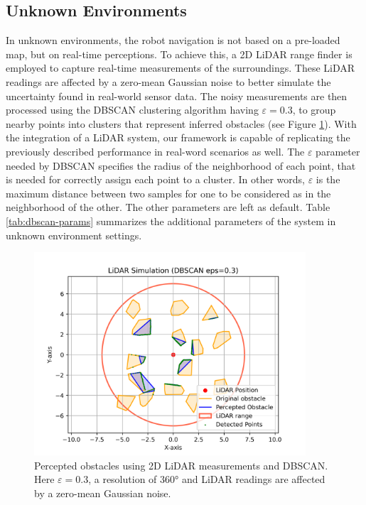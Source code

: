 \subsection{Unknown Environments}
In unknown environments, the robot navigation is not based on a pre-loaded map, but on real-time perceptions.
To achieve this, a 2D LiDAR range finder is employed to capture real-time measurements of the surroundings.
These LiDAR readings are affected by a zero-mean Gaussian noise to better simulate the uncertainty found in real-world sensor data.
The noisy measurements are then processed using the DBSCAN clustering algorithm having $\varepsilon = 0.3$, to
group nearby points into clusters that represent inferred obstacles (see Figure \ref{fig:dbscan_and_rangefinder}).
With the integration of a LiDAR system, our framework is capable of replicating the previously described performance
in real-word scenarios as well.
The $\varepsilon$ parameter needed by DBSCAN specifies the radius of the neighborhood of each point, that is
needed for correctly assign each point to a cluster. In other words,
$\varepsilon$ is the maximum distance between two samples for
one to be considered as in the neighborhood of the other.
The other parameters are left as default. Table \ref{tab:dbscan-params} summarizes the additional parameters of the
system in unknown environment settings.

\begin{figure}[H]
    \centering
    \includegraphics[width=0.9\textwidth]{../figures/Simulations/dbscan/dbscan_and_rangefinder.png}
    \caption{Percepted obstacles using 2D LiDAR measurements and DBSCAN. Here $\varepsilon=0.3$, a resolution of 360° and LiDAR readings are affected by a zero-mean Gaussian noise.}
    \label{fig:dbscan_and_rangefinder}
\end{figure}

